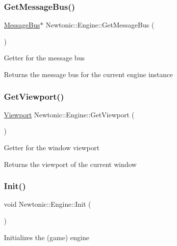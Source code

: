 \subsubsection{\texorpdfstring{GetMessageBus()}{GetMessageBus()}}
{\footnotesize\ttfamily \mbox{\hyperlink{classNewtonic_1_1MessageBus}{Message\+Bus}}$\ast$ Newtonic\+::\+Engine\+::\+Get\+Message\+Bus (\begin{DoxyParamCaption}{ }\end{DoxyParamCaption})\hspace{0.3cm}{\ttfamily [inline]}}

Getter for the message bus \begin{DoxyReturn}{Returns}
the message bus for the current engine instance 
\end{DoxyReturn}
\mbox{\label{classNewtonic_1_1Engine_a9e487f8b5d4bb4088bfec307bc520b56}} 
\subsubsection{\texorpdfstring{GetViewport()}{GetViewport()}}
{\footnotesize\ttfamily \mbox{\hyperlink{structNewtonic_1_1Viewport}{Viewport}} Newtonic\+::\+Engine\+::\+Get\+Viewport (\begin{DoxyParamCaption}{ }\end{DoxyParamCaption})\hspace{0.3cm}{\ttfamily [inline]}}

Getter for the window viewport \begin{DoxyReturn}{Returns}
the viewport of the current window 
\end{DoxyReturn}
\mbox{\label{classNewtonic_1_1Engine_ad0aeab0434bb214066f4ccecaf1cb28a}} 
\subsubsection{\texorpdfstring{Init()}{Init()}}
{\footnotesize\ttfamily void Newtonic\+::\+Engine\+::\+Init (\begin{DoxyParamCaption}{ }\end{DoxyParamCaption})}

Initializes the (game) engine \mbox{\label{classNewtonic_1_1Engine_aa0ce67e45fe633d9994526b6dd9628cd}} 
